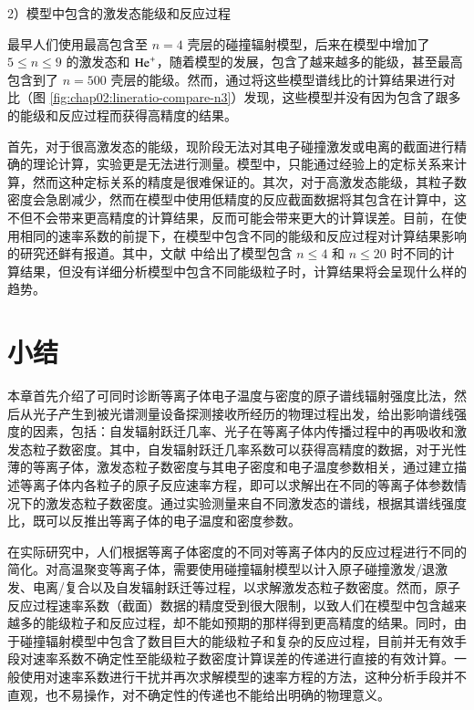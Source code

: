 2）模型中包含的激发态能级和反应过程

最早人们使用最高包含至 $n=4$ 壳层的碰撞辐射模型\cite{Brosda1993:Thesis,Schweer1992174}，后来在模型中增加了 $5\le n\le9$ 的激发态和 ${\rm He}^+$\cite{Schmitz2008}，随着模型的发展，包含了越来越多的能级\cite{Ahn2007-He-BES}，甚至最高包含到了 $n=500$ 壳层的能级\cite{burgos2012:PoP}。然而，通过将这些模型谱线比的计算结果进行对比（图 \ref{fig:chap02:lineratio-compare-n3}）发现，这些模型并没有因为包含了跟多的能级和反应过程而获得高精度的结果。

首先，对于很高激发态的能级，现阶段无法对其电子碰撞激发或电离的截面进行精确的理论计算，实验更是无法进行测量。模型中，只能通过经验上的定标关系来计算，然而这种定标关系的精度是很难保证的。其次，对于高激发态能级，其粒子数密度会急剧减少\cite{Fujimoto1979-HeCR,Griem1964-book}，然而在模型中使用低精度的反应截面数据将其包含在计算中，这不但不会带来更高精度的计算结果，反而可能会带来更大的计算误差。目前，在使用相同的速率系数的前提下，在模型中包含不同的能级和反应过程对计算结果影响的研究还鲜有报道。其中，文献   中给出了模型包含 $n\le4$ 和 $n\le20$ 时不同的计算结果，但没有详细分析模型中包含不同能级粒子时，计算结果将会呈现什么样的趋势。


\section{小结}

本章首先介绍了可同时诊断等离子体电子温度与密度的原子谱线辐射强度比法，然后从光子产生到被光谱测量设备探测接收所经历的物理过程出发，给出影响谱线强度的因素，包括：自发辐射跃迁几率、光子在等离子体内传播过程中的再吸收和激发态粒子数密度。其中，自发辐射跃迁几率系数可以获得高精度的数据，对于光性薄的等离子体，激发态粒子数密度与其电子密度和电子温度参数相关，通过建立描述等离子体内各粒子的原子反应速率方程，即可以求解出在不同的等离子体参数情况下的激发态粒子数密度。通过实验测量来自不同激发态的谱线，根据其谱线强度比，既可以反推出等离子体的电子温度和密度参数。

在实际研究中，人们根据等离子体密度的不同对等离子体内的反应过程进行不同的简化。对高温聚变等离子体，需要使用碰撞辐射模型以计入原子碰撞激发/退激发、电离/复合以及自发辐射跃迁等过程，以求解激发态粒子数密度。然而，原子反应过程速率系数（截面）数据的精度受到很大限制，以致人们在模型中包含越来越多的能级粒子和反应过程，却不能如预期的那样得到更高精度的结果。同时，由于碰撞辐射模型中包含了数目巨大的能级粒子和复杂的反应过程，目前并无有效手段对速率系数不确定性至能级粒子数密度计算误差的传递进行直接的有效计算。一般使用对速率系数进行干扰并再次求解模型的速率方程的方法，这种分析手段并不直观，也不易操作，对不确定性的传递也不能给出明确的物理意义。

